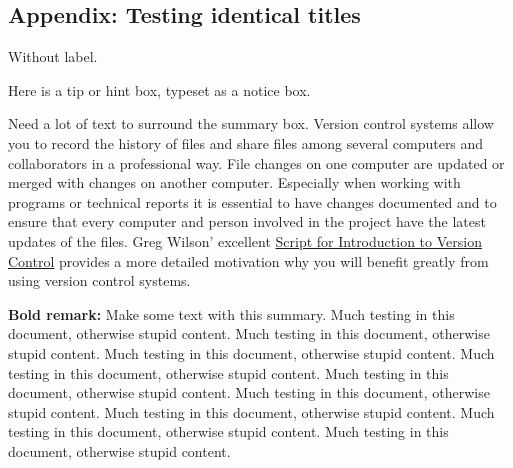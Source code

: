 \documentclass[%
oneside,                 %
final,                   %
10pt]{article}
\newenvironment{notice_mdfboxadmon}[1][]{
\begin{notice_mdfboxmdframed}[frametitle=#1]
}
{
\end{notice_mdfboxmdframed}
}
\newenvironment{summary_mdfboxadmon}[1][]{
\begin{summary_mdfboxmdframed}[frametitle=#1]
}
{
\end{summary_mdfboxmdframed}
}
\theoremstyle{definition}
\begin{document}
\begin{enumerate}
\subsection{Appendix: Testing identical titles}
Without label.

\begin{notice_mdfboxadmon}[Tip.]
Here is a tip or hint box, typeset as a notice box.
\end{notice_mdfboxadmon} %


\clearpage
Need a lot of text to surround the summary box.
Version control systems allow you to record the history of files
and share files among several computers and collaborators in a
professional way. File changes on one computer are updated or
merged with changes on another computer. Especially when working
with programs or technical reports it is essential
to have changes documented and to
ensure that every computer and person involved in the project
have the latest updates of the files.
Greg Wilson' excellent \href{{https://software-carpentry.org/2010/07/script-for-introduction-to-version-control/}}{Script for Introduction to Version Control} provides a more detailed motivation why you will benefit greatly
from using version control systems.

\begin{summary_mdfboxadmon}[Summary.]
\textbf{Bold remark:} Make some text with this summary.
Much testing in this document, otherwise stupid content.
Much testing in this document, otherwise stupid content.
Much testing in this document, otherwise stupid content.
Much testing in this document, otherwise stupid content.
Much testing in this document, otherwise stupid content.
Much testing in this document, otherwise stupid content.
Much testing in this document, otherwise stupid content.
Much testing in this document, otherwise stupid content.
Much testing in this document, otherwise stupid content.
\end{summary_mdfboxadmon} %



\end{enumerate}
\end{document}
